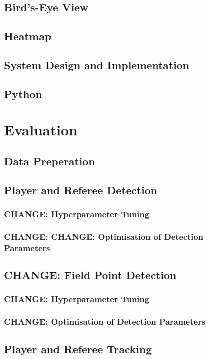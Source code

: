 \documentclass[12pt, letterpaper]{article}
\begin{document}
\subsection{Bird’s-Eye View}
\subsection{Heatmap}
\subsection{System Design and Implementation}
\subsection{Python}
\newpage

\section{Evaluation}

\subsection{Data Preperation}
\subsection{Player and Referee Detection}
\subsubsection{\textbf{CHANGE}: Hyperparameter Tuning}
\subsubsection{\textbf{CHANGE}: \textbf{CHANGE}: Optimisation of Detection Parameters}
\subsection{\textbf{CHANGE}: Field Point Detection}
\subsubsection{\textbf{CHANGE}: Hyperparameter Tuning}
\subsubsection{\textbf{CHANGE}: Optimisation of Detection Parameters}
\subsection{Player and Referee Tracking}
\end{document}
